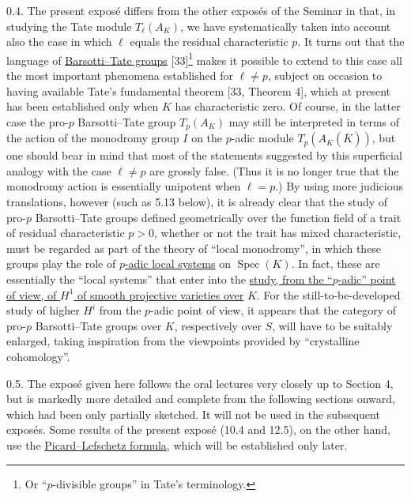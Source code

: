 0.4. The present expos\'e differs from the other expos\'es of the
Seminar in that, in studying the Tate module $T_\ell(A_K)$, we have
systematically taken into account also the case in which $\ell$ equals
the residual characteristic $p$. It turns out that the language of
\underline{Barsotti--Tate groups} [33]\footnote{Or ``$p$-divisible
groups'' in Tate's terminology.} makes it possible to extend to this
case all the most important phenomena established for $\ell\ne p$,
subject on occasion to having available Tate's fundamental theorem
[33, Theorem 4], which at present has been established only when $K$
has characteristic zero. Of course, in the latter case the pro-$p$
Barsotti--Tate group $T_p(A_K)$ may still be interpreted in terms of
the action of the monodromy group $I$ on the $p$-adic module
$T_p(A_K(\overline K))$, but one should bear in mind that most of the
statements suggested by this superficial analogy with the case
$\ell\ne p$ are grossly false. (Thus it is no longer true that the
monodromy action is essentially unipotent when $\ell=p$.) By using more
judicious translations, however (such as 5.13 below), it is already
clear that the study of pro-$p$ Barsotti--Tate groups defined
geometrically over the function field of a trait of residual
characteristic $p>0$, whether or not the trait has mixed
characteristic, must be regarded as part of the theory of ``local
monodromy'', in which these groups play the role of \underline{$p$-adic
local systems} on $\operatorname{Spec}(K)$. In fact, these are
essentially the ``local systems'' that enter into the \underline{study,
from the ``$p$-adic'' point of view, of $H^1$ of smooth projective
varieties over} $K$. For the still-to-be-developed study of higher
$H^i$ from the $p$-adic point of view, it appears that the category of
pro-$p$ Barsotti--Tate groups over $K$, respectively over $S$, will
have to be suitably enlarged, taking inspiration from the viewpoints
provided by ``crystalline cohomology''.

0.5. The expos\'e given here follows the oral lectures very closely up
to Section 4, but is markedly more detailed and complete from the
following sections onward, which had been only partially sketched. It
will not be used in the subsequent expos\'es. Some results of the
present expos\'e (10.4 and 12.5), on the other hand, use the
\underline{Picard--Lefschetz formula}, which will be established only
later.

